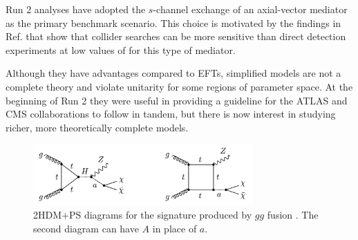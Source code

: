 



Run 2 \monoX analyses have adopted the $s$-channel exchange of an axial-vector mediator as the primary benchmark scenario. This choice is motivated by the findings in Ref. \cite{Boveia:2016mrp} that show that collider searches can be more sensitive than direct detection experiments at low values of \mchi for this type of mediator. 

Although they have advantages compared to EFTs, simplified models are not a complete theory and violate unitarity for some regions of parameter space. At the beginning of Run 2 they were useful in providing a guideline for the ATLAS and CMS collaborations to follow in tandem, but there is now interest in studying richer, more theoretically complete models. 

\begin{figure}[htb]
\centering
\includegraphics[width=0.75\textwidth]{Figures/2hdma.png}
\caption{2HDM+PS diagrams for the \monoZ signature produced by $gg$ fusion \cite{Bauer:2017ota}. The second diagram can have $A$ in place of $a$.}
\label{fig:2hdmaDiagrams}
\end{figure}

